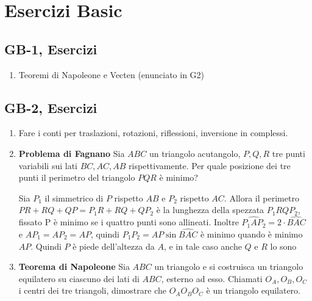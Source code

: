
\section{Esercizi Basic}
\subsection{GB-1, Esercizi}
\begin{enumerate}
\item Teoremi di Napoleone e Vecten (enunciato in G2)

\end{enumerate}


\subsection{GB-2, Esercizi}
\begin{enumerate}
       \item Fare i conti per traslazioni, rotazioni, riflessioni, inversione in complessi. 

       \item \textbf{Problema di Fagnano} Sia $ABC$ un triangolo acutangolo, $P,Q,R$ tre punti variabili sui lati $BC,AC,AB$ rispettivamente. Per quale posizione dei tre punti il perimetro del triangolo $PQR$ è minimo?
       
      \begin{sol}Sia $P_1$ il simmetrico di $P$ rispetto $AB$ e $P_2$ rispetto $AC$. Allora il perimetro $PR+RQ+QP=P_1R+RQ+QP_2$ è la lunghezza della spezzata $P_1RQP_2$, fissato P è minimo se i quattro punti sono allineati. Inoltre $\widehat{P_1AP_2}=2\cdot\widehat{BAC}$ e $AP_1=AP_2=AP$, quindi $P_1P_2=AP \sin{\widehat{BAC}}$ è minimo quando è minimo $AP$. Quindi $P$ è piede dell'altezza da $A$, e in tale caso anche $Q$ e $R$ lo sono
       \end{sol}
      
       \item \textbf{Teorema di Napoleone} Sia $ABC$ un triangolo e si costruisca un triangolo equilatero su ciascuno dei lati di $ABC$, esterno ad esso. Chiamati $O_A,O_B,O_C$ i centri dei tre triangoli, dimostrare che $O_AO_BO_C$ è un triangolo equilatero.
     

\end{enumerate}
